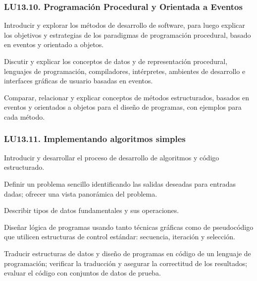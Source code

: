 \subsubsection{LU13.10. Programación Procedural y Orientada a Eventos}\label{sec:BOK-LU13.10}\label{sec:LU13.10}
\begin{LearningUnit}
\begin{LUGoal}
\item Introducir y explorar los métodos de desarrollo de software, para luego explicar los objetivos y estrategias de los paradigmas de programación procedural, basado en eventos y orientado a objetos.
\end{LUGoal}

\begin{LUObjective}
\item Discutir y explicar los conceptos de datos y de representación procedural, lenguajes de programación, compiladores, intérpretes, ambientes de desarrollo e interfaces gráficas de usuario basadas en eventos.
\item Comparar, relacionar y explicar conceptos de métodos estructurados, basados en eventos y orientados a objetos para el diseño de programas, con ejemplos para cada método.
\end{LUObjective}
\end{LearningUnit}

\subsubsection{LU13.11. Implementando algoritmos simples}\label{sec:BOK-LU13.11}\label{sec:LU13.11}
\begin{LearningUnit}
\begin{LUGoal}
\item Introducir y desarrollar el proceso de desarrollo de algoritmos y código estructurado.
\end{LUGoal}

\begin{LUObjective}
\item Definir un problema sencillo identificando las salidas deseadas para entradas dadas; ofrecer una vista panorámica del problema.
\item Describir tipos de datos fundamentales y sus operaciones.
\item Diseñar lógica de programas usando tanto técnicas gráficas como de pseudocódigo que utilicen estructuras de control estándar: secuencia, iteración y selección.
\item Traducir estructuras de datos y diseño de programas en código de un lenguaje de programación; verificar la traducción y asegurar la correctitud de los resultados; evaluar el código con conjuntos de datos de prueba.
\end{LUObjective}
\end{LearningUnit}

